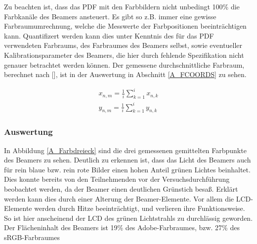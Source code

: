 Zu beachten ist, dass das PDF mit den Farbbildern nicht unbedingt 100\% die Farbkanäle des Beamers ansteuert. Es gibt so z.B. immer eine gewisse Farbraumumrechnung, welche die Messwerte der Farbpositionen beeinträchtigen kann. Quantifizert werden kann dies unter Kenntnis des für das PDF verwendeten Farbraums, des Farbraumes des Beamers selbst, sowie eventueller Kalibrationsparameter des Beamers, die hier durch fehlende Spezifikation nicht genauer betrachtet werden können. Der gemessene durchschnittliche Farbraum, berechnet nach [\cite[Seite 27]{AML_SKRIPT}], ist in der Auswertung in Abschnitt \ref{A_FCOORDS} zu sehen.

\begin{eqnarray*}
x_{n,m} = \frac{1}{i}\sum_{k=1}^{i} x_{n,k} \\
y_{n,m} = \frac{1}{i}\sum_{k=1}^{i} y_{n,k}
\end{eqnarray*}

\subsubsection{Auswertung}

In Abbildung \ref{A_Farbdreieck} sind die drei gemessenen gemittelten Farbpunkte des Beamers zu sehen. Deutlich zu erkennen ist, dass das Licht des Beamers auch für rein blaue bzw. rein rote Bilder einen hohen Anteil grünen Lichtes beinhaltet. Dies konnte bereits von den Teilnehmenden vor der Versuchsdurchführung beobachtet werden, da der Beamer einen deutlichen Grünstich besaß. Erklärt werden kann dies durch einer Alterung der Beamer-Elemente. Vor allem die LCD-Elemente werden durch Hitze beeinträchtigt, und verlieren ihre Funktionsweise. So ist hier anscheinend der LCD des grünen Lichtstrahls zu durchlässig geworden. 
Der Flächeninhalt des Beamers ist 19\% des Adobe-Farbraumes, bzw. 27\% des sRGB-Farbraumes